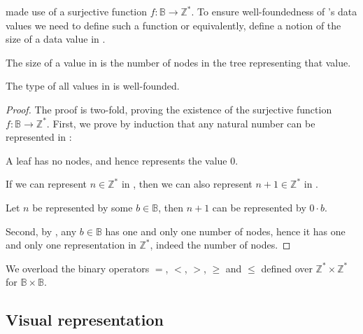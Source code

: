  made use of a surjective function $f :
\mathbb{B}\rightarrow\mathbb{Z}^*$. To ensure well-foundedness of \D{}'s data
values we need to define such a function or equivalently, define a notion of
the size of a data value in \D{}.

\begin{definition}\label{definition:size} The size of a value in \D{} is the
number of nodes in the tree representing that value.\end{definition}

\begin{theorem}\label{theorem:type-is-well-founded} The type of all values in
\D{} is well-founded.\end{theorem}

\begin{proof} The proof is two-fold, proving the existence of the surjective
function $f:\mathbb{B}\rightarrow\mathbb{Z}^*$. First, we prove by induction that
any natural number can be represented in \D{}:

\begin{description}[\setleftmargin{70pt}\setlabelstyle{\bf}]

\item [Base case] A leaf has no nodes, and hence represents the value $0$.

\item [Assumption] If we can represent $n\in\mathbb{Z}^*$ in \D{}, then we can
also represent $n+1\in\mathbb{Z}^*$ in \D{}. 

\item [Induction] Let $n$ be represented by some $b\in\mathbb{B}$, then $n+1$
can be represented by $0\cdot b$. 

\end{description}

Second, by , any $b\in\mathbb{B}$ has one and only
one number of nodes, hence it has one and only one representation in
$\mathbb{Z}^*$, indeed the number of nodes.\end{proof}

\begin{definition} We overload the binary operators $=$, $<$, $>$, $\geq$ and
$\leq$ defined over $\mathbb{Z}^*\times\mathbb{Z}^*$ for
$\mathbb{B}\times\mathbb{B}$.\end{definition}

\subsection{Visual representation}

